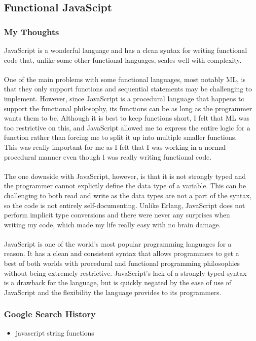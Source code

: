 \documentclass[letterpaper, 10pt, DIV=13]{scrartcl}
\numberwithin{equation}{section}
\numberwithin{figure}{section}
\numberwithin{table}{section}
\begin{document}
\subsection{Functional JavaScipt}
\subsubsection{My Thoughts}
JavaScript is a wonderful language and has a clean syntax for writing functional code that, unlike some other functional languages,
scales well with complexity.
\\ \\
One of the main problems with some functional languages, most notably ML, is that they only support functions and sequential statements
may be challenging to implement. However, since JavaScript is a procedural language that happens to support the functional philosophy,
its functions can be as long as the programmer wants them to be. Although it is best to keep functions short, I felt that ML was
too restrictive on this, and JavaScript allowed me to express the entire logic for a function rather than forcing me to split it up
into multiple smaller functions. This was really important for me as I felt that I was working in a normal procedural manner even
though I was really writing functional code.
\\ \\
The one downside with JavaScript, however, is that it is not strongly typed and the programmer cannot explictly define the data type
of a variable. This can be challenging to both read and write as the data types are not a part of the syntax, so the code is not entirely
self-documenting. Unlike Erlang, JavaScript does not perform implicit type conversions and there were never any surprises when writing my code,
which made my life really easy with no brain damage.
\\ \\
JavaScript is one of the world's most popular programming languages for a reason. It has a clean and consistent syntax that allows programmers
to get a best of both worlds with procedural and functional programming philosophies without being extremely restrictive. JavaScript's lack of
a strongly typed syntax is a drawback for the language, but is quickly negated by the ease of use of JavaScript and the flexibility the
language provides to its programmers.

\subsubsection{Google Search History}
\begin{itemize}
    \item javascript string functions
\end{itemize}
\end{document}
